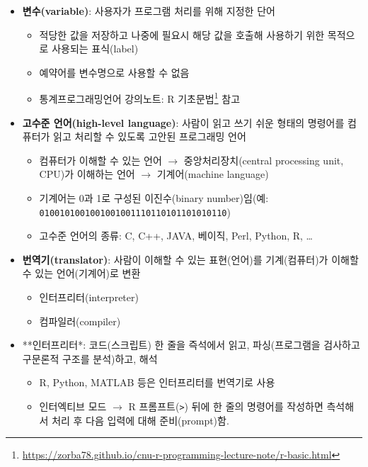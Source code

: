\documentclass[
  11pt,
]{krantz}
\providecommand{\tightlist}{%
  \setlength{\itemsep}{0pt}\setlength{\parskip}{0pt}}
\renewcommand{\href}[2]{#2\footnote{\url{#1}}}
\begin{document}
\normalsize

\begin{itemize}
\tightlist
\item
  \textbf{변수(variable)}: 사용자가 프로그램 처리를 위해 지정한 단어

  \begin{itemize}
  \tightlist
  \item
    적당한 값을 저장하고 나중에 필요시 해당 값을 호출해 사용하기 위한 목적으로 사용되는 표식(label)
  \item
    예약어를 변수명으로 사용할 수 없음
  \item
    \href{https://zorba78.github.io/cnu-r-programming-lecture-note/r-basic.html}{통계프로그래밍언어 강의노트: R 기초문법} 참고
  \end{itemize}
\item
  \textbf{고수준 언어(high-level language)}: 사람이 읽고 쓰기 쉬운 형태의 명령어를 컴퓨터가 읽고 처리할 수 있도록 고안된 프로그래밍 언어

  \begin{itemize}
  \tightlist
  \item
    컴퓨터가 이해할 수 있는 언어 \(\rightarrow\) 중앙처리장치(central processing unit, CPU)가 이해하는 언어 \(\rightarrow\) 기계어(machine language)
  \item
    기계어는 0과 1로 구성된 이진수(binary number)임(예: \texttt{0100101001001001001110110101101010110})
  \item
    고수준 언어의 종류: C, C++, JAVA, 베이직, Perl, Python, R, \ldots{}
  \end{itemize}
\item
  \textbf{번역기(translator)}: 사람이 이해할 수 있는 표현(언어)를 기계(컴퓨터)가 이해할 수 있는 언어(기계어)로 변환

  \begin{itemize}
  \tightlist
  \item
    인터프리터(interpreter)
  \item
    컴파일러(compiler)
  \end{itemize}
\item
  **인터프리터*: 코드(스크립트) 한 줄을 즉석에서 읽고, 파싱(프로그램을 검사하고 구문론적 구조를 분석)하고, 해석

  \begin{itemize}
  \tightlist
  \item
    R, Python, MATLAB 등은 인터프리터를 번역기로 사용
  \item
    인터엑티브 모드 \(\rightarrow\) R 프롬프트(\texttt{\textgreater{}}) 뒤에 한 줄의 명령어를 작성하면 측석해서 처리 후 다음 입력에 대해 준비(prompt)함.
  \end{itemize}
\end{itemize}
\end{document}
